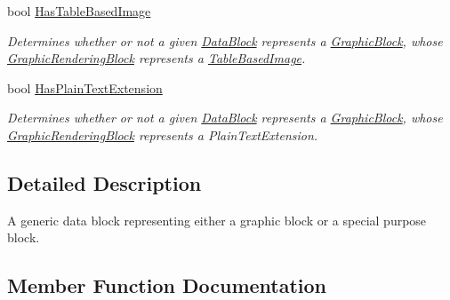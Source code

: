 \begin{DoxyCompactItemize}
bool \hyperlink{classvcvj_1_1_models_1_1_grammatical___components_1_1_data_block_a5e1cede8610e08ba960710f5e5bf1293}{Has\+Table\+Based\+Image}
\begin{DoxyCompactList}\small\item\em Determines whether or not a given \hyperlink{classvcvj_1_1_models_1_1_grammatical___components_1_1_data_block}{Data\+Block} represents a \hyperlink{classvcvj_1_1_models_1_1_grammatical___components_1_1_graphic_block}{Graphic\+Block}, whose \hyperlink{classvcvj_1_1_models_1_1_grammatical___components_1_1_graphic_rendering_block}{Graphic\+Rendering\+Block} represents a \hyperlink{classvcvj_1_1_models_1_1_grammatical___components_1_1_table_based_image}{Table\+Based\+Image}. \end{DoxyCompactList}\item 
bool \hyperlink{classvcvj_1_1_models_1_1_grammatical___components_1_1_data_block_a6d08fab7e1c1ba82f00f220655f6aa9b}{Has\+Plain\+Text\+Extension}
\begin{DoxyCompactList}\small\item\em Determines whether or not a given \hyperlink{classvcvj_1_1_models_1_1_grammatical___components_1_1_data_block}{Data\+Block} represents a \hyperlink{classvcvj_1_1_models_1_1_grammatical___components_1_1_graphic_block}{Graphic\+Block}, whose \hyperlink{classvcvj_1_1_models_1_1_grammatical___components_1_1_graphic_rendering_block}{Graphic\+Rendering\+Block} represents a Plain\+Text\+Extension. \end{DoxyCompactList}\end{DoxyCompactItemize}


\subsection{Detailed Description}
A generic data block representing either a graphic block or a special purpose block. 



\subsection{Member Function Documentation}

